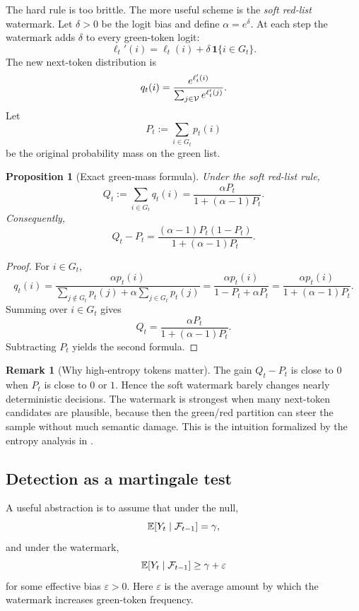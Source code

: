 \documentclass[11pt]{article}
\newtheorem{proposition}[theorem]{Proposition}
\theoremstyle{definition}
\newtheorem{remark}[theorem]{Remark}
\newcommand{\E}{\mathbb{E}}
\newcommand{\1}{\mathbf{1}}
\begin{document}
The hard rule is too brittle. The more useful scheme is the \emph{soft red-list} watermark. Let $\delta>0$ be the logit bias and define $\alpha=e^{\delta}$. At each step the watermark adds $\delta$ to every green-token logit:
\[
\ell_t'(i) = \ell_t(i) + \delta\,\1\{i\in G_t\}.
\]
The new next-token distribution is
\[
q_t(i) = \frac{e^{\ell_t'(i)}}{\sum_{j \in {\cal V}} e^{\ell_t'(j)}}.
\]
Let
\[
P_t := \sum_{i\in G_t} p_t(i)
\]
be the original probability mass on the green list.

\begin{proposition}[Exact green-mass formula]
Under the soft red-list rule,
\[
Q_t := \sum_{i\in G_t} q_t(i) = \frac{\alpha P_t}{1+(\alpha-1)P_t}.
\]
Consequently,
\[
Q_t-P_t = \frac{(\alpha-1)P_t(1-P_t)}{1+(\alpha-1)P_t}.
\]
\end{proposition}

\begin{proof}
For $i\in G_t$,
\[
q_t(i) = \frac{\alpha p_t(i)}{\sum_{j\notin G_t} p_t(j) + \alpha \sum_{j\in G_t} p_t(j)}
      = \frac{\alpha p_t(i)}{1-P_t + \alpha P_t}
      = \frac{\alpha p_t(i)}{1+(\alpha-1)P_t}.
\]
Summing over $i\in G_t$ gives
\[
Q_t = \frac{\alpha P_t}{1+(\alpha-1)P_t}.
\]
Subtracting $P_t$ yields the second formula.
\end{proof}

\begin{remark}[Why high-entropy tokens matter]
The gain $Q_t-P_t$ is close to $0$ when $P_t$ is close to $0$ or $1$. Hence the soft watermark barely changes nearly deterministic decisions. The watermark is strongest when many next-token candidates are plausible, because then the green/red partition can steer the sample without much semantic damage. This is the intuition formalized by the entropy analysis in \cite{kirchenbauer2023watermark}.
\end{remark}

\subsection{Detection as a martingale test}

A useful abstraction is to assume that under the null,
\[
\E[Y_t\mid\cF_{t-1}] = \gamma,
\]
and under the watermark,
\[
\E[Y_t\mid\cF_{t-1}] \ge \gamma + \varepsilon
\]
for some effective bias $\varepsilon>0$. Here $\varepsilon$ is the average amount by which the watermark increases green-token frequency.
\end{document}
